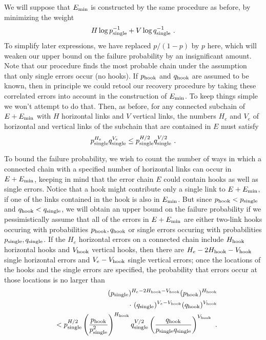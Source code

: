 We will suppose that $E_{\rm min}$ is constructed by the same procedure as before, by minimizing the weight
\begin{equation}
H\log p_{\rm single}^{-1} + V\log q_{\rm single}^{-1}~.
\end{equation}
To simplify later expressions, we have replaced $p/(1-p)$ by $p$ here, which will weaken our upper bound on the failure probability by an insignificant amount. Note that our procedure finds the most probable chain under the assumption that only single errors occur (no hooks). If $p_{\rm hook}$ and $q_{\rm hook}$ are assumed to be known, then in principle we could retool our
recovery procedure by taking these correlated errors into account in the
construction of $E_{\rm min}$.  To keep things simple we won't attempt to do that.
Then, as before, for
any connected subchain of $E+E_{\rm min}$ with $H$ horizontal links and $V$
vertical links, the numbers $H_e$ and $V_e$ of horizontal and vertical links of
the subchain that are contained in $E$ must satisfy
\begin{equation}
p_{\rm single}^{H_e}q_{\rm single}^{V_e}\le p_{\rm single}^{H/2} q_{\rm single}^{V/2}~.
\end{equation}

To bound the failure probability, we wish to count the number of ways in which a connected chain with a specified number of horizontal links can occur in $E+E_{\rm min}$, keeping in mind that  the error chain $E$ could contain hooks as well as single errors. Notice that a hook might contribute only a single link to $E+E_{\rm min}$, if one of the links contained in the hook is also in $E_{\rm min}$. But since $p_{\rm hook}<p_{\rm single}$ and $q_{\rm hook}<q_{\rm single}$, we will obtain an upper bound on the failure probability if we pessimistically assume  that all of the errors in $E+E_{\rm min}$ are either two-link hooks occuring with probabilities $p_{\rm hook},q_{\rm hook}$ or single errors occuring with probabilities $p_{\rm single},q_{\rm single}$. If the $H_e$ horizontal errors on a connected chain include $H_{\rm hook}$ horizontal hooks and $V_{\rm hook}$ vertical hooks, then there are $H_e-2H_{\rm hook}- V_{\rm hook}$ single horizontal errors and $V_e-V_{\rm hook}$ single vertical errors; once the locations of the hooks and the single errors are specified, the probability that errors occur at those locations is no larger than
\begin{eqnarray}
&&(p_{\rm single})^{H_e-2H_{\rm hook}-V_{\rm hook}}(p_{\rm hook})^{H_{\rm
hook}}\nonumber\\
&&\quad\cdot ~(q_{\rm single})^{V_e-V_{\rm hook}}(q_{\rm hook})^{V_{\rm hook}}\nonumber\\
&&<p_{\rm single}^{H/2}\left({p_{\rm hook}\over p_{\rm single}^2}\right)^{H_{\rm hook}}q_{\rm single}^{V/2}\left({q_{\rm hook}\over p_{\rm single} q_{\rm single}}\right)^{V_{\rm hook}}~.
\label{location_bound}
\end{eqnarray}

